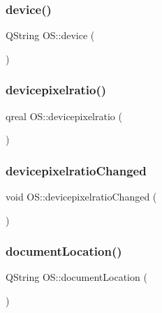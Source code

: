 \subsubsection{\texorpdfstring{device()}{device()}}
{\footnotesize\ttfamily Q\+String O\+S\+::device (\begin{DoxyParamCaption}{ }\end{DoxyParamCaption})}

\mbox{\label{classOS_abec33b96eb8c7def86f6f918dc1849c0}} 
\subsubsection{\texorpdfstring{devicepixelratio()}{devicepixelratio()}}
{\footnotesize\ttfamily qreal O\+S\+::devicepixelratio (\begin{DoxyParamCaption}{ }\end{DoxyParamCaption})}

\mbox{\label{classOS_a0ecbe56e6ec612ba6f78af5086505751}} 
\subsubsection{\texorpdfstring{devicepixelratioChanged}{devicepixelratioChanged}}
{\footnotesize\ttfamily void O\+S\+::devicepixelratio\+Changed (\begin{DoxyParamCaption}{ }\end{DoxyParamCaption})\hspace{0.3cm}{\ttfamily [signal]}}

\mbox{\label{classOS_a88ba12fba1acd2557506942e0099634b}} 
\subsubsection{\texorpdfstring{documentLocation()}{documentLocation()}}
{\footnotesize\ttfamily Q\+String O\+S\+::document\+Location (\begin{DoxyParamCaption}{ }\end{DoxyParamCaption})}

\mbox{\label{classOS_a0dac0a86aca0d89d27b9596999506713}} 
